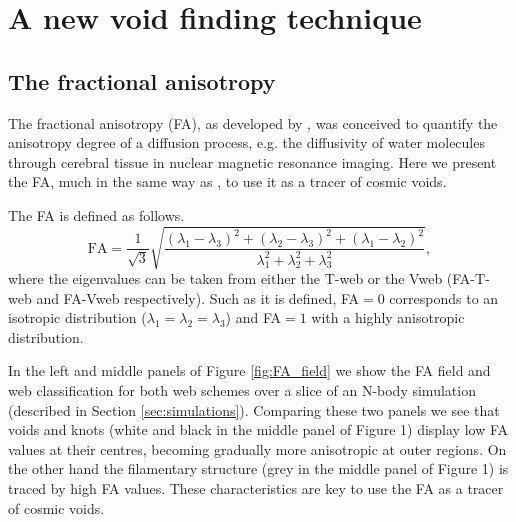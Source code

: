 \documentclass[a4,useAMS,usenatbib,usegraphicx]{mn2e}
\newcommand{\eq}[2]{\begin{equation} \label{eq:#1} #2 \end{equation}}
\begin{document}
\section{A new void finding technique}
\label{sec:bulk_voids}


\subsection{The fractional anisotropy}
\label{subsec:FA_voids}


The fractional anisotropy (FA), as developed by \citet{Basser95}, was 
conceived to quantify the anisotropy degree of a diffusion process, e.g. 
the diffusivity of water molecules through cerebral tissue in nuclear
magnetic resonance imaging. 
Here we present the FA, much in the same way as \citet{Libeskind13},
to use it as a tracer of cosmic voids.


The FA is defined as follows.
\eq{fractional_anisotropy}
{{\mathrm{FA}} = \frac{1}{\sqrt{3}}\sqrt{ \frac{ (\lambda_1 - \lambda_3)^2 + 
(\lambda_2 - \lambda_3)^2 + (\lambda_1 - \lambda_2)^2}{ \lambda_1^2 + 
\lambda_2^2 + \lambda_3^2} },}
where the eigenvalues can be taken from either the T-web or the Vweb 
(FA-T-web and FA-Vweb respectively). Such as it is defined, FA$=0$ 
corresponds to an isotropic distribution ($\lambda_1=\lambda_2=\lambda_3$) 
and FA$=1$ with a highly anisotropic distribution.


In the left and middle panels of Figure \ref{fig:FA_field} we show the
FA field and web classification for both  web schemes over a slice of
an N-body simulation (described in Section \ref{sec:simulations}). 
Comparing these two panels we see that voids and knots (white
and black in the middle panel of Figure 1) display low FA values at
their  centres, becoming gradually more anisotropic at outer regions.  
On the other hand the filamentary structure (grey in the middle panel
of Figure 1) is traced by high FA values.  
These characteristics are key to use the FA as a tracer of cosmic voids. 



\end{document}
